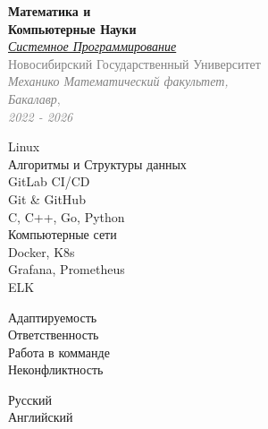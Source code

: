 \documentclass[10pt, a4paper]{article}
\begin{document}
\begin{minipage}[t]{0.4\textwidth}

\begin{minipage}[t]{\textwidth}
    \raggedright
    \textbf{\Large Математика и \\Компьютерные Науки} \\[2pt]
    \textit{\large \href{https://sys.pro/}{Системное Программирование} \extlink} \\[4pt]
    \textcolor{graytext}{Новосибирский Государственный Университет} \\
    \textcolor{graytext}{\textit{Механико Математический факультет, \\Бакалавр},\\ \textit{2022 - 2026}}
\end{minipage}

\vspace{0.5cm}

\begin{minipage}[t]{0.5\textwidth}
    \raggedright
    \small
    Linux \\[4pt]
    Алгоритмы и Структуры данных \\[4pt]
    GitLab CI/CD \\[4pt]
    Git \& GitHub \\[4pt]
    C, C++, Go, Python \\[4pt]
    Компьютерные сети \\[4pt]
    Docker, K8s \\[4pt]
    Grafana, Prometheus \\[4pt]
    ELK
\end{minipage}%
\hfill
\begin{minipage}[t]{0.5\textwidth}
    \raggedleft
    \small
    Адаптируемость \\[4pt]
    Ответственность \\[4pt]
    Работа в комманде \\[4pt]
    Неконфликтность \\[4pt]
\end{minipage}

\vspace{0.5cm}

Русский \\[4pt]
Английский


\end{minipage}
\end{document}
